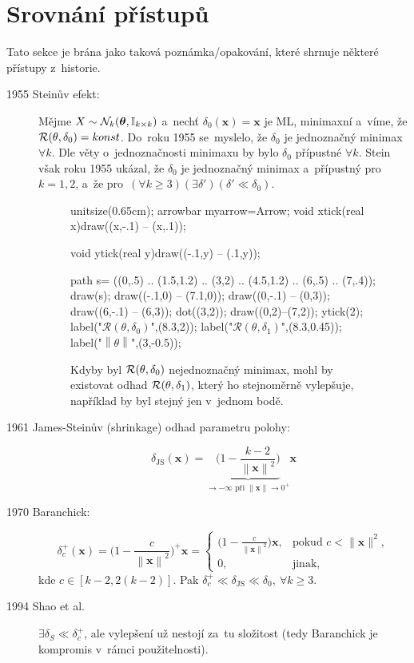\section{Srovnání přístupů}
Tato sekce je brána jako taková poznámka/opakování, které shrnuje některé přístupy z~historie.
\begin{description}
	\item[1955 Steinův efekt:] Mějme $X\sim \mathcal{N}_k(\boldsymbol{\theta},\mathbb{I}_{k\times k})$ a~nechť $\delta_0(\textbf{x})=\textbf{x}$ je ML, minimaxní a~víme, že $\mathcal{R}(\theta,\delta_0)=konst$. Do~roku 1955 se~myslelo, že $\delta_0$ je jednoznačný minimax $\forall k$. Dle věty o~jednoznačnosti minimaxu by bylo $\delta_0$  přípustné $\forall k$. Stein však roku 1955 ukázal, že $\delta_0$ je jednoznačný minimax a~přípustný pro~$k=1,2$, a~že pro~$(\forall k\geq3)(\exists\delta')(\delta'\ll\delta_0)$.
	\begin{figure}[h]
		\centering
		\begin{asy}
		unitsize(0.65cm);
		arrowbar myarrow=Arrow;
		void xtick(real x){draw((x,-.1) -- (x,.1));}
		
		void ytick(real y){draw((-.1,y) -- (.1,y));}
		
		path s= ((0,.5) .. (1.5,1.2) .. (3,2) .. (4.5,1.2) .. (6,.5) .. (7,.4));
		draw(s);
		draw((-.1,0) -- (7.1,0));
		draw((0,-.1) -- (0,3));
		draw((6,-.1) -- (6,3));
		dot((3,2));
		draw((0,2)--(7,2));
		ytick(2);
		label("$\mathcal{R}(\theta,\delta_0)$",(8.3,2));
		label("$\mathcal{R}(\theta,\delta_1)$",(8.3,0.45));
		label("$\left\|\theta\right\|$",(3,-0.5));
		\end{asy}
		\caption{Kdyby byl $\mathcal{R}(\theta,\delta_0)$ nejednoznačný minimax, mohl by existovat odhad $\mathcal{R}(\theta,\delta_1)$, který ho stejnoměrně vylepšuje, například by byl stejný jen v~jednom bodě.}\label{pic2}
	\end{figure}
	\FloatBarrier
	\item[1961 James-Steinův (shrinkage) odhad parametru polohy:]$$ \delta_\mathrm{JS}(\textbf{x})=\underbrace{\Big(1-\frac{k-2}{\left\|\textbf{x}\right\|^2}\Big)}_{\to-\infty\text{ při~}\left\|\textbf{x}\right\|\to0^+}\textbf{x} $$
	\item[1970 Baranchick:] $$ \delta_c^+(\textbf{x})=\Big(1-\frac{c}{\left\|\textbf{x}\right\|^2}\Big)^+\textbf{x}=\begin{cases}
	\big(1-\frac{c}{\left\|\textbf{x}\right\|^2}\big)\textbf{x}, & \text{pokud }c<\|\textbf{x}\|^2, \\0, & \text{jinak,}
	\end{cases} $$
	kde $c\in [k-2,2(k-2)]$. Pak $\delta_c^+\ll \delta_\mathrm{JS} \ll \delta_0,~\forall k\geq 3$.
	\item[1994 Shao et al.] $\exists \delta_S \ll \delta_c^+$, ale vylepšení už nestojí za~tu složitost (tedy Baranchick je kompromis v~rámci použitelnosti).
\end{description}
